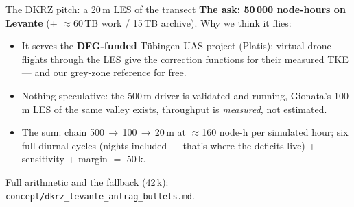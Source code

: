\documentclass[11pt,aspectratio=169]{beamer}
\begin{document}
\begin{frame}{The DKRZ pitch: a 20\,m LES of the transect}
  \textbf{The ask: \alert{50\,000 node-hours} on Levante} (+ $\approx$60\,TB
  work / 15\,TB archive). Why we think it flies:
  \vspace{1ex}
  \begin{itemize}
    \item It serves the \textbf{DFG-funded} Tübingen UAS project (Platis):
      virtual drone flights through the LES give the correction functions for
      their measured TKE --- and our grey-zone reference for free.
    \item Nothing speculative: the 500\,m driver is validated and running,
      Gionata's 100\,m LES of the same valley exists, throughput is
      \emph{measured}, not estimated.
    \item The sum: chain 500\,$\to$\,100\,$\to$\,20\,m at $\approx$160
      node-h per simulated hour; six full diurnal cycles (nights included ---
      that's where the deficits live) + sensitivity + margin $=$ 50\,k.
  \end{itemize}
  \vspace{1ex}
  Full arithmetic and the fallback (42\,k):
  \texttt{concept/dkrz\_levante\_antrag\_bullets.md}.
\end{frame}
\end{document}
